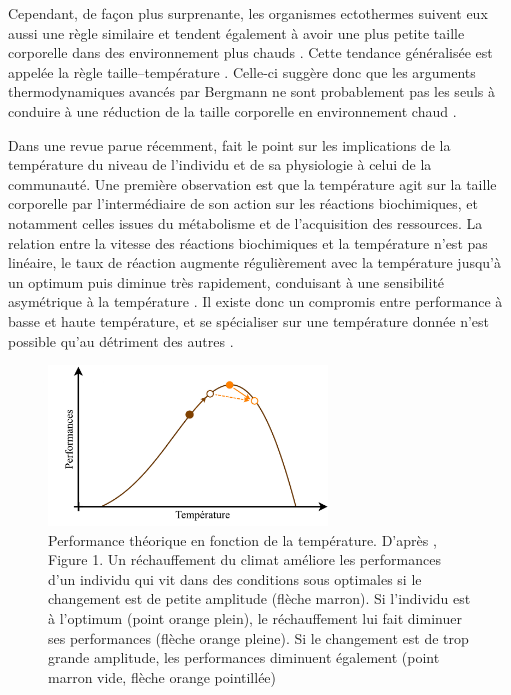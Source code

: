 Cependant, de façon plus surprenante, les organismes ectothermes suivent eux
aussi une règle similaire et tendent également à avoir une plus petite taille
corporelle dans des environnement plus chauds \autocites{angilletta2009a,ohlberger2013a}.
Cette tendance généralisée est appelée la règle taille--température
\autocites[``temperature--size rule''][]{atkinson1994a}. Celle-ci suggère donc
que les arguments thermodynamiques avancés par Bergmann ne sont probablement pas les seuls à
conduire à une réduction de la taille corporelle en environnement chaud
\autocite{edeline2013a}.

Dans une revue parue récemment, \textcite{ohlberger2013a} fait le point sur les
implications de la température du niveau de l'individu et de sa physiologie à
celui de la communauté. Une première observation est que la température agit sur
la taille corporelle par l'intermédiaire de son action sur les réactions
biochimiques, et notamment celles issues du métabolisme et de l'acquisition des
ressources. La relation entre la vitesse des réactions biochimiques et la
température n'est pas linéaire, le taux de réaction augmente régulièrement avec
la température jusqu'à un optimum puis diminue très rapidement, conduisant à une
sensibilité asymétrique à la température \autocites{hochachka2002a,
angilletta2009a}. Il existe donc un compromis entre performance à basse et haute
température, et se spécialiser sur une température donnée n'est possible qu'au
détriment des autres \autocites{angilletta2009a}.

\begin{figure}[!ht] %
\centering
\includegraphics[width=0.66\textwidth]{1_CorpsDeThese/EA/Fig/ThermalCurve.pdf}
\caption[
Performance théorique en fonction de la température]{Performance théorique en
fonction de la température. D'après \textcites{ohlberger2013a}, Figure 1. Un
réchauffement du climat améliore les performances d'un individu qui vit dans
des conditions sous optimales si le changement est de petite amplitude (flèche
marron). Si l'individu est à l'optimum (point orange plein), le réchauffement
lui fait diminuer ses performances (flèche orange pleine). Si le changement est
de trop grande amplitude, les performances diminuent également (point marron
vide, flèche orange pointillée)}
\label{Fig:EA1}
\end{figure}

